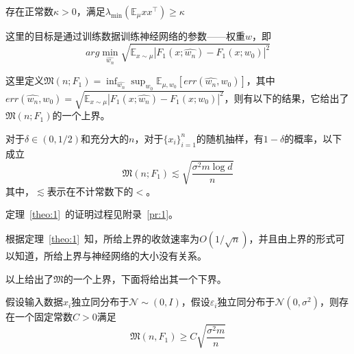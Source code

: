 \begin{assumption}
存在正常数$\kappa > 0$，满足$\lambda_{\min}(\mathbb{E}_\mu x x^\top )\geq \kappa$
\end{assumption}
\par
这里的目标是通过训练数据训练神经网络的参数——权重$w$，即
\[
	arg\min_{\hat{w_n}} \sqrt{\mathbb{E}_{x\sim\mu}|F_1(x;\hat{w_n})- F_1(x;w_0)|^2}
\]
\par
这里定义$\mathfrak{M}(n;F_1) = \inf_{\hat{w_n}}\sup_{w_0}\mathbb{E}_{\mu,w_0}[err(\hat{w_n},w_0)]$，其中$err(\hat{w_n},w_0) = \sqrt{\mathbb{E}_{x\sim\mu}|F_1(x;\hat{w_n})- F_1(x;w_0)|^2}$，则有以下的结果，它给出了$\mathfrak{M}(n;F_1)$的一个上界。
\begin{theorem}\label{theo:1}
对于$\delta\in (0,1/2)$和充分大的$n$，对于$\{x_i\}_{i=1}^n$的随机抽样，有$1-\delta$的概率，以下成立
\[
	\mathfrak{M}(n;F_1) \lesssim \sqrt{\frac{\sigma^2 m \log d}{n}}
\]
其中，$\lesssim$表示在不计常数下的$<$。
\end{theorem}
\par
定理~\ref{theo:1}~的证明过程见附录~\ref{pr:1}。

\par
根据定理~\ref{theo:1}~知，所给上界的收敛速率为$O(1/\sqrt{n})$，并且由上界的形式可以知道，所给上界与神经网络的大小没有关系。
\par
以上给出了$\mathfrak{M}$的一个上界，下面将给出其一个下界。
\begin{theorem}\label{theo:2}
假设输入数据$x_i$独立同分布于$\mathcal{N}\sim (0,I)$，假设$\varepsilon_i$独立同分布于$\mathcal{N}(0,\sigma^2)$，则存在一个固定常数$C > 0$满足
\begin{equation}
\mathfrak{M}(n,F_1) \geq C\sqrt{\frac{\sigma^2 m}{n}}
\end{equation}
\end{theorem}



